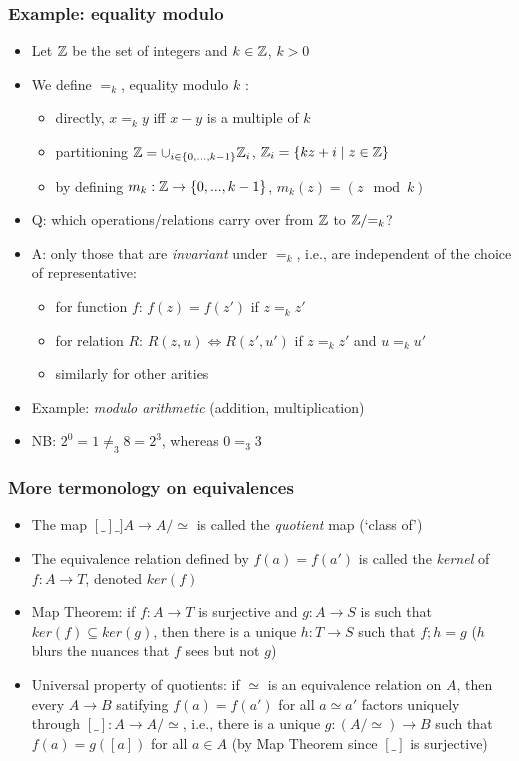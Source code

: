 \documentclass[handout]{beamer}
\begin{document}
\frame
  {   
    \frametitle{Example: equality modulo}\label{Ch4:EqExa}

 \begin{itemize}[<+->]
\item Let $\mathbb{Z}$ be the set of integers and $k\in\mathbb{Z}$, $k>0$
\item We define $=_k$, equality modulo $k$ :
   \begin{itemize}[<+->]
\item directly, $x =_k y$ iff $x-y$ is a multiple of $k$
\item partitioning $\mathbb{Z} = \cup_{i\in \{0,...,k-1\}} \mathbb{Z}_i $, $\mathbb{Z}_i = \{kz+i \mid z\in\mathbb{Z}\}$
\item by defining  $m_k: \mathbb{Z}\to \{0,...,k-1\}$, $m_k(z) = (z \mod k)$ 
   \end{itemize}
\item Q: which operations/relations carry over from $\mathbb{Z}$ to $\mathbb{Z}/{=_k}$?
\item A: only those that are \emph{invariant} under ${=_k}$, i.e., are
independent of the choice of representative:
   \begin{itemize}[<+->]
\item for function $f$:  $f(z) = f(z')$ if $z =_k z'$ 
\item for relation $R$:  $R(z,u) \iff R(z',u')$    if $z =_k z'$ and $u =_k u'$
\item similarly for other arities
   \end{itemize}
\item Example: \emph{modulo arithmetic} (addition, multiplication)
\item {\color{red}NB}: $2^0 = 1 \neq_3 8 = 2^3$, whereas $0 =_3 3$
 \end{itemize}

 }

\frame
  {   
    \frametitle{More termonology on equivalences}\label{Ch4:Eqvs}

 \begin{itemize}[<+->]
\item The map $[\_] \_] A\to A/{\simeq}$ is called the \emph{quotient} map (`class of')
\item The equivalence relation defined by $f(a)=f(a')$  is called the \emph{kernel} of $f:A\to T$,
 denoted $ker(f)$
\item Map Theorem: if $f:A\to T$ is surjective and $g:A\to S$ is such that $ker(f)\subseteq ker(g)$,
then there is a unique $h: T\to S$ such that $f;h=g$ ($h$ blurs the  nuances 
that $f$ sees but not $g$)
\item Universal property of quotients: if $\simeq$ is an equivalence relation on $A$,
then every $A\to B$  satifying $f(a)=f(a')$ for all $a\simeq a'$ factors uniquely
through $[\_]:  A\to A/{\simeq}$, i.e., there is a unique $g: (A/{\simeq})\to B$ such
that $f(a) = g([a])$ for all $a\in A$ (by Map Theorem since $[\_]$ is surjective)
 \end{itemize}

 }
\end{document}
